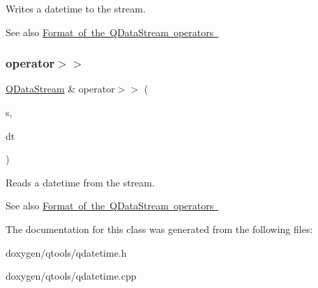 Writes a datetime to the stream.

\begin{DoxySeeAlso}{See also}
\mbox{\hyperlink{}{Format of the Q\+Data\+Stream operators }} 
\end{DoxySeeAlso}
\mbox{\label{class_q_date_time_afb6acd9837e7b1d8fc54e6665a9adc29}} 
\subsubsection{\texorpdfstring{operator$>$$>$}{operator>>}}
{\footnotesize\ttfamily \mbox{\hyperlink{class_q_data_stream}{Q\+Data\+Stream}} \& operator$>$$>$ (\begin{DoxyParamCaption}\item[{\mbox{\hyperlink{class_q_data_stream}{Q\+Data\+Stream}} \&}]{s,  }\item[{\mbox{\hyperlink{class_q_date_time}{Q\+Date\+Time}} \&}]{dt }\end{DoxyParamCaption})\hspace{0.3cm}{\ttfamily [friend]}}

Reads a datetime from the stream.

\begin{DoxySeeAlso}{See also}
\mbox{\hyperlink{}{Format of the Q\+Data\+Stream operators }} 
\end{DoxySeeAlso}


The documentation for this class was generated from the following files\+:\begin{DoxyCompactItemize}
\item 
doxygen/qtools/qdatetime.\+h\item 
doxygen/qtools/qdatetime.\+cpp\end{DoxyCompactItemize}

